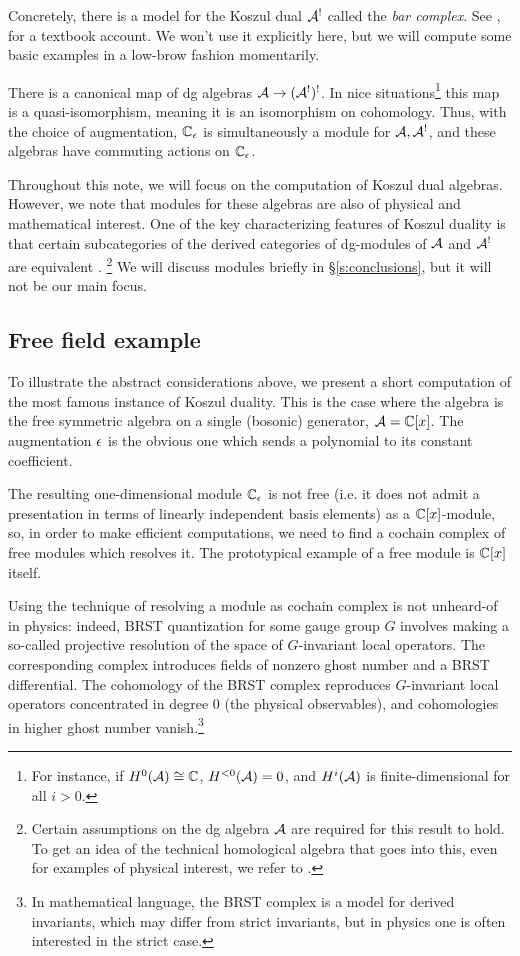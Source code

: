 \documentclass[11pt]{amsart}
\begin{document}
Concretely, there is a model for the Koszul dual $\mathcal A^!$ called the {\em bar complex}.
See \cite{Weibel}, for a textbook account. 
We won't use it explicitly here, but we will compute some basic examples in a low-brow fashion momentarily. 

There is a canonical map of dg algebras $\mathcal A \to (\mathcal A^!)^!$. 
In nice situations\footnote{For instance, if $H^0 (\mathcal A) \cong \mathbb C$, $H^{<0} (\mathcal A) = 0$, and $H^i(\mathcal A)$ is finite-dimensional for all $i > 0$.} 
this map is a quasi-isomorphism, meaning it is an isomorphism on cohomology. 
Thus, with the choice of augmentation, $\mathbb C_\epsilon$ is simultaneously a module for $\mathcal A, \mathcal A^!$, and these algebras have commuting actions on $\mathbb C_\epsilon$.

Throughout this note, we will focus on the computation of Koszul dual algebras. 
However, we note that modules for these algebras are also of physical and mathematical interest. 
One of the key characterizing features of Koszul duality is that certain subcategories of the derived categories of dg-modules of $\mathcal A$ and $\mathcal A^!$ are equivalent \cite{BGG, BGSch, BGSoerg, Pos}. \footnote{Certain assumptions on the dg algebra $\mathcal A$ are required for this result to hold. 
To get an idea of the technical homological algebra that goes into this, even for examples of physical interest, we refer to \cite[Section 8]{CYangian}. } 
We will discuss modules briefly in \S \ref{s:conclusions}, but it will not be our main focus. 

\subsection{Free field example} 

To illustrate the abstract considerations above, we present a short computation of the most famous instance of Koszul duality. 
This is the case where the algebra is the free symmetric algebra on a single (bosonic) generator, $\mathcal A = \mathbb C[x]$. 
The augmentation $\epsilon$ is the obvious one which sends a polynomial to its constant coefficient. 

The resulting one-dimensional module $\mathbb C_{\epsilon}$ is not free (i.e. it does not admit a presentation in terms of linearly independent basis elements) as a $\mathbb C[x]$-module, so, in order to make efficient computations, we need to find a cochain complex of free modules which resolves it. 
The prototypical example of a free module is $\mathbb C[x]$ itself.

Using the technique of resolving a module as cochain complex is not unheard-of in physics: indeed, BRST quantization for some gauge group $G$ involves making a so-called projective resolution of the space of $G$-invariant local operators. 
The corresponding complex introduces fields of nonzero ghost number and a BRST differential. 
The cohomology of the BRST complex reproduces $G$-invariant local operators concentrated in degree 0 (the physical observables), and cohomologies in higher ghost number vanish.\footnote{In mathematical language, the BRST complex is a model for derived invariants, which may differ from strict invariants, but in physics one is often interested in the strict case.}
\end{document}
